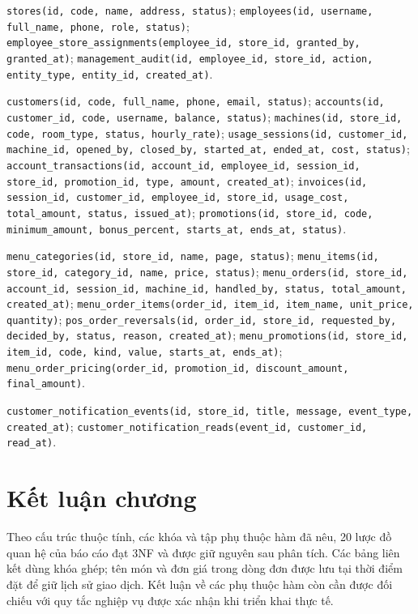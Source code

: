 \begin{description}[leftmargin=4.1cm,labelwidth=3.9cm,style=nextline]
  \item[Nhóm cửa hàng và nhân viên] \texttt{stores(id, code, name, address, status)}; \texttt{employees(id, username, full\_name, phone, role, status)}; \texttt{employee\_store\_assignments(employee\_id, store\_id, granted\_by, granted\_at)}; \texttt{management\_audit(id, employee\_id, store\_id, action, entity\_type, entity\_id, created\_at)}.
  \item[Nhóm khách hàng và phiên máy] \texttt{customers(id, code, full\_name, phone, email, status)}; \texttt{accounts(id, customer\_id, code, username, balance, status)}; \texttt{machines(id, store\_id, code, room\_type, status, hourly\_rate)}; \texttt{usage\_sessions(id, customer\_id, machine\_id, opened\_by, closed\_by, started\_at, ended\_at, cost, status)}; \texttt{account\_transactions(id, account\_id, employee\_id, session\_id, store\_id, promotion\_id, type, amount, created\_at)}; \texttt{invoices(id, session\_id, customer\_id, employee\_id, store\_id, usage\_cost, total\_amount, status, issued\_at)}; \texttt{promotions(id, store\_id, code, minimum\_amount, bonus\_percent, starts\_at, ends\_at, status)}.
  \item[Nhóm thực đơn và đơn hàng] \texttt{menu\_categories(id, store\_id, name, page, status)}; \texttt{menu\_items(id, store\_id, category\_id, name, price, status)}; \texttt{menu\_orders(id, store\_id, account\_id, session\_id, machine\_id, handled\_by, status, total\_amount, created\_at)}; \texttt{menu\_order\_items(order\_id, item\_id, item\_name, unit\_price, quantity)}; \texttt{pos\_order\_reversals(id, order\_id, store\_id, requested\_by, decided\_by, status, reason, created\_at)}; \texttt{menu\_promotions(id, store\_id, item\_id, code, kind, value, starts\_at, ends\_at)}; \texttt{menu\_order\_pricing(order\_id, promotion\_id, discount\_amount, final\_amount)}.
  \item[Nhóm thông báo] \texttt{customer\_notification\_events(id, store\_id, title, message, event\_type, created\_at)}; \texttt{customer\_notification\_reads(event\_id, customer\_id, read\_at)}.
\end{description}

\section{Kết luận chương}
Theo cấu trúc thuộc tính, các khóa và tập phụ thuộc hàm đã nêu, 20 lược đồ quan hệ của báo cáo đạt 3NF và được giữ nguyên sau phân tích. Các bảng liên kết dùng khóa ghép; tên món và đơn giá trong dòng đơn được lưu tại thời điểm đặt để giữ lịch sử giao dịch. Kết luận về các phụ thuộc hàm còn cần được đối chiếu với quy tắc nghiệp vụ được xác nhận khi triển khai thực tế.
